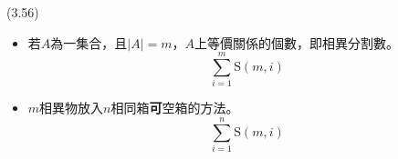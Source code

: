 \item \begin{theorem}{(3.56)} \quad\quad \begin{itemize}
        \item 若$A$為一集合，且$|A| = m$，$A$上等價關係的個數，即相異分割數。\begin{equation}
            \sum_{i = 1}^{m} \text{S}(m, i)
        \end{equation}
        \item $m$相異物放入$n$相同箱\textbf{可}空箱的方法。\begin{equation}
            \sum_{i = 1}^{n} \text{S}(m, i)
        \end{equation}
    \end{itemize}
\end{theorem}
